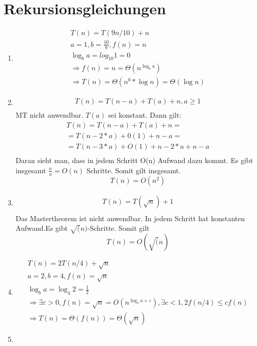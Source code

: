 \documentclass[a4paper,10pt]{scrartcl}
\begin{document}
\section{Rekursionsgleichungen}
\begin{enumerate}
\item	\begin{align}
	T(n) = T(9n/10)+n \\
	a = 1, b = \frac{10}{9}, f(n) = n \\
	\log _b a = log _{10} 1 = 0 \\
	\Rightarrow f(n) = n = \Theta(n^{\log _b a}) \\
	\Rightarrow T(n) = \Theta(n^0 * \log n) = \Theta(\log n) \tag{Fall 2 des Master-Theorems}
	\end{align}
\item	\begin{align}
	T(n) = T(n-a) + T(a) + n, a \geq 1 \\
	\end{align}
	MT nicht anwendbar.
	$T(a)$ sei konstant. Dann gilt:
	\begin{align}
	 T(n) = T(n-a) + T(a) + n = \\
	 = T(n - 2*a) + 0(1) + n - a = \\
	 = T(n - 3*a) + O(1) + n - 2*a + n - a \\
	\end{align}
	Daran sieht man, dass in jedem Schritt O(n) Aufwand dazu kommt. Es gibt insgesamt $\frac{n}{a} = O(n)$ Schritte.
	Somit gilt insgesamt.
	\[ T(n) = O(n^2) \]
\item	\begin{align}
	T(n) = T(\sqrt{n}) + 1 \\
	\end{align}
	Das Mastertheorem ist nicht anwendbar. In jedem Schritt hat konstanten Aufwand.Es gibt $\sqrt(n)$-Schritte. Somit gilt
  \[ T(n) = O(\sqrt(n)\]
\item	\begin{align}
	T(n) = 2T(n/4) + \sqrt{n} \\
	a = 2, b = 4, f(n) = \sqrt{n} \\
	\log _b a = \log _4 2 = \frac{1}{2} \\
	\Rightarrow \exists \varepsilon > 0, f(n) = \sqrt{n} = O(n^{\log
	_b a+\varepsilon}), \exists c < 1, 2f(n/4) \leq cf(n) \\
	\Rightarrow T(n) = \Theta(f(n)) = \Theta(\sqrt{n})\tag{Fall 3 des Master-Theorems}
	\end{align}
\item	\begin{align}

\end{align}
\end{enumerate}
\end{document}
